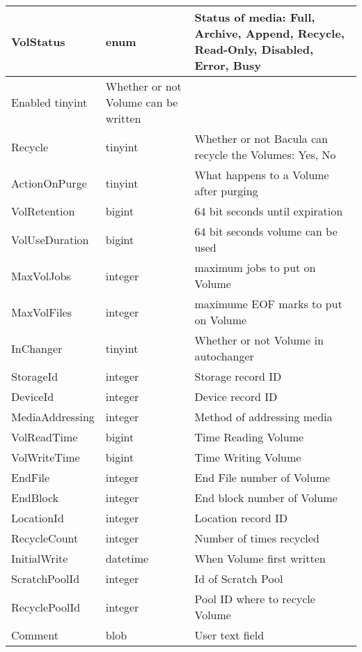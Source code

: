 {{{\begin{longtable}{|l|l|p{2.4in}|}
 \hline 
{VolStatus  } & {enum  } & {Status of media: Full, Archive, Append, Recycle, 
Read-Only, Disabled, Error, Busy  } \\
 \hline 
{Enabled } {tinyint  } & {Whether or not Volume can be written } \\
 \hline 
{Recycle  } & {tinyint  } & {Whether or not Bacula can recycle the Volumes:
Yes, No  } \\
 \hline 
{ActionOnPurge  } & {tinyint  } & {What happens to a Volume after purging  } \\
 \hline 
{VolRetention  } & {bigint  } & {64 bit seconds until expiration  } \\
 \hline 
{VolUseDuration  } & {bigint  } & {64 bit seconds volume can be used  } \\
 \hline 
{MaxVolJobs  } & {integer  } & {maximum jobs to put on Volume  } \\
 \hline 
{MaxVolFiles  } & {integer  } & {maximume EOF marks to put on Volume }
\\ \hline 
{InChanger  } & {tinyint  } & {Whether or not Volume in autochanger } \\
 \hline 
{StorageId  } & {integer  } & {Storage record ID } \\
 \hline 
{DeviceId  } & {integer  } & {Device record ID } \\
 \hline 
{MediaAddressing  } & {integer } & {Method of addressing media } \\
 \hline 
{VolReadTime  } & {bigint  } & {Time Reading Volume } \\
 \hline 
{VolWriteTime  } & {bigint  } & {Time Writing Volume } \\
 \hline 
{EndFile  } & {integer  } & {End File number of Volume } \\
 \hline 
{EndBlock  } & {integer  } & {End block number of Volume } \\
 \hline 
{LocationId  } & {integer  } & {Location record ID } \\
 \hline 
{RecycleCount  } & {integer  } & {Number of times recycled } \\
 \hline 
{InitialWrite  } & {datetime  } & {When Volume first written } \\
 \hline 
{ScratchPoolId  } & {integer  } & {Id of Scratch Pool  } \\
 \hline 
{RecyclePoolId  } & {integer  } & {Pool ID where to recycle Volume } \\
 \hline 
{Comment  } & {blob  } & {User text field } \\
 \hline 



\end{longtable}}}}
